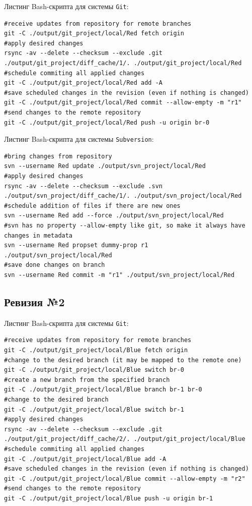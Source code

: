 Листинг Bash-скрипта для системы \texttt{Git}:
\begin{lstlisting}
#receive updates from repository for remote branches
git -C ./output/git_project/local/Red fetch origin
#apply desired changes
rsync -av --delete --checksum --exclude .git ./output/git_project/diff_cache/1/. ./output/git_project/local/Red
#schedule commiting all applied changes
git -C ./output/git_project/local/Red add -A
#save scheduled changes in the revision (even if nothing is changed)
git -C ./output/git_project/local/Red commit --allow-empty -m "r1"
#send changes to the remote repository
git -C ./output/git_project/local/Red push -u origin br-0
\end{lstlisting}

Листинг Bash-скрипта для системы \texttt{Subversion}:
\begin{lstlisting}
#bring changes from repository
svn --username Red update ./output/svn_project/local/Red
#apply desired changes
rsync -av --delete --checksum --exclude .svn ./output/svn_project/diff_cache/1/. ./output/svn_project/local/Red
#schedule addition of files if there are new ones
svn --username Red add --force ./output/svn_project/local/Red
#svn has no property --allow-empty like git, so make it always have changes in metadata
svn --username Red propset dummy-prop r1 ./output/svn_project/local/Red
#save done changes on branch
svn --username Red commit -m "r1" ./output/svn_project/local/Red
\end{lstlisting}


\subsection{Ревизия №2}

Листинг Bash-скрипта для системы \texttt{Git}:
\begin{lstlisting}
#receive updates from repository for remote branches
git -C ./output/git_project/local/Blue fetch origin
#change to the desired branch (it may be mapped to the remote one)
git -C ./output/git_project/local/Blue switch br-0
#create a new branch from the specified branch
git -C ./output/git_project/local/Blue branch br-1 br-0
#change to the desired branch
git -C ./output/git_project/local/Blue switch br-1
#apply desired changes
rsync -av --delete --checksum --exclude .git ./output/git_project/diff_cache/2/. ./output/git_project/local/Blue
#schedule commiting all applied changes
git -C ./output/git_project/local/Blue add -A
#save scheduled changes in the revision (even if nothing is changed)
git -C ./output/git_project/local/Blue commit --allow-empty -m "r2"
#send changes to the remote repository
git -C ./output/git_project/local/Blue push -u origin br-1
\end{lstlisting}

